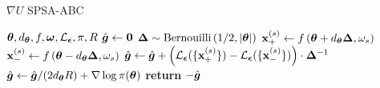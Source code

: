 \begin{algorithm}[t]
	\caption{$\nabla U$ SPSA-ABC}\label{algo:spsa}
	\begin{algorithmic}
		 ${\bm \theta}, d_{{\bm \theta}}, f, {\bm \omega}, \mathcal{L}_{{\bm {\epsilon}}}, \pi, R$ 
		\STATE $\hat{{\bm g }} \leftarrow {\bm 0}$
        \STATE ${\bm \Delta} \sim \text{Bernouilli}\left( 1/2, |{\bm \theta}| \right)$ 
          \STATE ${\bf x}^{(s)}_{+} \leftarrow f\left( {\bm \theta} + d_{{\bm \theta}} {\bm \Delta}, \omega_s \right)$
          \STATE ${\bf x}^{(s)}_{-} \leftarrow f\left( {\bm \theta} - d_{{\bm \theta}} {\bm \Delta}, \omega_s \right)$
        \ENDFOR
        \STATE $\hat{{\bm g }} \leftarrow \hat{{\bm g }} + \left( \mathcal{L}_{{\bm {\epsilon}}}( \{{\bf x}^{(s)}_{+}\}) - \mathcal{L}_{{\bm {\epsilon}}}( \{{\bf x}^{(s)}_{-}\}) \right) \cdot {\bm \Delta}^{-1}$
			\ENDFOR
    \STATE $\hat{{\bm g }} \leftarrow \hat{{\bm g }}/(2d_{{\bm \theta}} R) + \nabla \log \pi({\bm \theta})$
		\STATE \textbf{return} $-\hat{{\bm g }}$
	\end{algorithmic}
\end{algorithm}